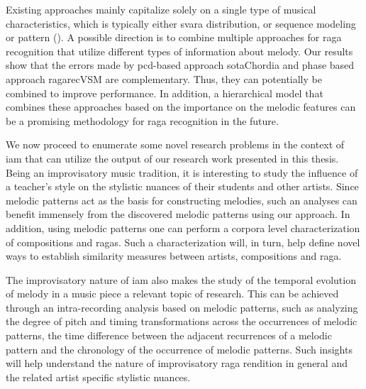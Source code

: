 Existing approaches mainly capitalize solely on a single type of musical characteristics, which is typically either svara distribution, or sequence modeling or pattern (). A possible direction is to combine multiple approaches for \gls{raga} recognition that utilize different types of information about melody. Our results show that the errors made by \gls{pcd}-based approach \acrshort{sotaChordia} and phase based approach \acrshort{ragarecVSM}  are complementary. Thus, they can potentially be combined to improve performance. In addition, a hierarchical model that combines these approaches based on the importance on the melodic features can be a promising methodology for \gls{raga} recognition in the future.

We now proceed to enumerate some novel research problems in the context of \gls{iam} that can utilize the output of our research work presented in this thesis. Being an improvisatory music tradition, it is interesting to study the influence of a teacher’s style on the stylistic nuances of their students and other artists. Since melodic patterns act as the  basis for constructing melodies, such an analyses can benefit immensely from the discovered melodic patterns using our approach. In addition, using melodic patterns one can perform a corpora level characterization of compositions and ragas. Such a characterization will, in turn, help define novel ways to establish similarity measures between artists, compositions and \gls{raga}.

The improvisatory nature of \gls{iam} also makes the study of the temporal evolution of melody in a music piece a relevant topic of research. This can be achieved through an intra-recording analysis based on melodic patterns, such as analyzing the degree of pitch and timing transformations across the occurrences of melodic patterns, the time difference between the adjacent recurrences of a melodic pattern and the chronology of the occurrence of melodic patterns. Such insights will help understand the nature of improvisatory \gls{raga} rendition in general and the related artist specific stylistic nuances.

